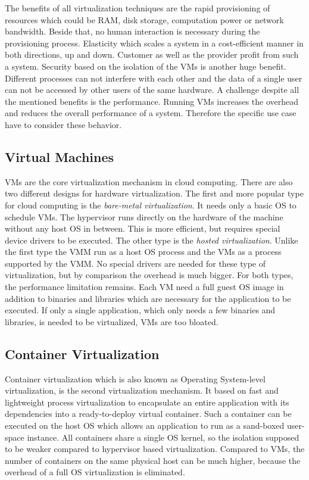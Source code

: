 The benefits of all virtualization techniques are the rapid provisioning of resources which could be \ac{RAM}, disk storage, computation power or network bandwidth.
Beside that, no human interaction is necessary during the provisioning process.
Elasticity which scales a system in a cost-efficient manner in both directions, up and down.
Customer as well as the provider profit from such a system.
Security based on the isolation of the \acp{VM} is another huge benefit.
Different processes can not interfere with each other and the data of a single user can not be accessed by other users of the same hardware.
A challenge despite all the mentioned benefits is the performance.
Running \acp{VM} increases the overhead and reduces the overall performance of a system.
Therefore the specific use case have to consider these behavior.


\subsection{Virtual Machines}
\acp{VM} are the core virtualization mechanism in cloud computing.
There are also two different designs for hardware virtualization.
The first and more popular type for cloud computing is the \textit{bare-metal virtualization}.
It needs only a basic OS to schedule \acp{VM}.
The hypervisor runs directly on the hardware of the machine without any host \ac{OS} in between.
This is more efficient, but requires special device drivers to be executed.
The other type is the \textit{hosted virtualization}.
Unlike the first type the \ac{VMM} run as a host \ac{OS} process and the \acp{VM} as a process supported by the \ac{VMM}.
No special drivers are needed for these type of virtualization, but by comparison the overhead is much bigger.
For both types, the performance limitation remains.
Each \ac{VM} need a full guest \ac{OS} image in addition to binaries and libraries which are necessary for the application to be executed.\autocite[cf.][p. 381]{Pahl:2015}
If only a single application, which only needs a few binaries and libraries, is needed to be virtualized, \acp{VM} are too bloated.


\subsection{Container Virtualization}
Container virtualization which is also known as Operating System-level virtualization, is the second virtualization mechanism.
It based on fast and lightweight process virtualization to encapsulate an entire application with its dependencies into a ready-to-deploy virtual container.\autocite[cf.][p. 72]{Tosatto:2015}
Such a container can be executed on the host \ac{OS} which allows an application to run as a sand-boxed user-space instance.\autocite[cf.][p. 1]{Anderson:2016}
All containers share a single \ac{OS} kernel, so the isolation supposed to be weaker compared to hypervisor based virtualization.\autocite[cf.][p. 2]{Celesti:2016}
Compared to \acp{VM}, the number of containers on the same physical host can be much higher, because the overhead of a full \ac{OS} virtualization is eliminated.\autocite[cf.][p. 2]{Celesti:2016}


